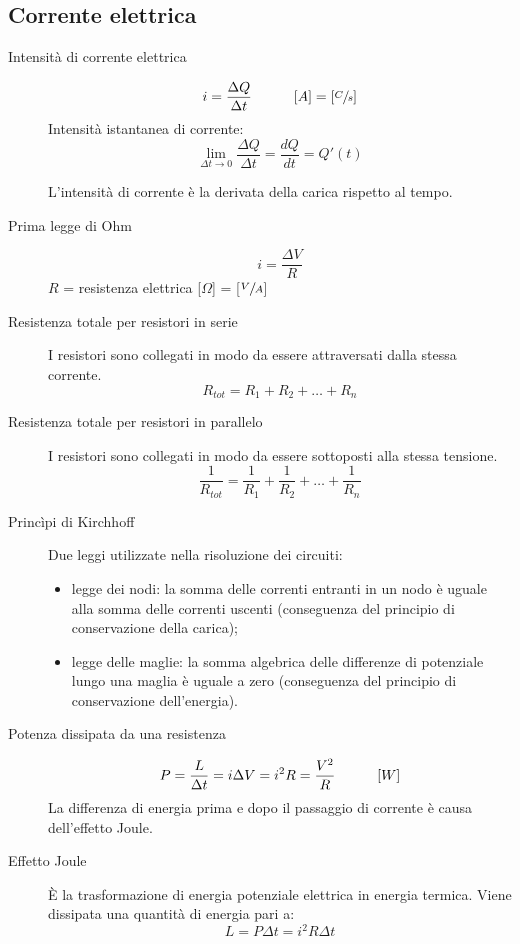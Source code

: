 \documentclass[a4paper,11pt,italian]{article}
\begin{document}
\subsection{Corrente elettrica}
\begin{description}
  \item[Intensità di corrente elettrica]
  \[ i = \frac{\Delta Q}{\Delta t} \hspace*{3em} [A] = \left[ \sfrac{C}{s} \right] \]
  Intensità istantanea di corrente:   
  \[ \lim_{\Delta t \rightarrow 0} \frac{\Delta Q}{\Delta t} = \frac{dQ}{dt} = Q'(t) \]
  
  L'intensità di corrente è la derivata della carica rispetto al tempo.
  
  \item[Prima legge di Ohm]
  \[ i = \frac{\Delta V}{R} \]
  $ R $ = resistenza elettrica [$ \Omega$] = [$\sfrac{V}{A} $]
  
  \item[Resistenza totale per resistori in serie] 
  I resistori sono collegati in modo da essere attraversati dalla stessa corrente.
  \[ R_{tot} = R_1 + R_2 + \ldots + R_n \]
  
  \item[Resistenza totale per resistori in parallelo] 
  I resistori sono collegati in modo da essere sottoposti alla stessa tensione.
  \[ \frac{1}{R_{tot}} = \frac{1}{R_1} + \frac{1}{R_2} + \ldots + \frac{1}{R_n}  \]
  
  \item[Princìpi di Kirchhoff] 
  Due leggi utilizzate nella risoluzione dei circuiti:
  \begin{itemize}
    \item legge dei nodi: la somma delle correnti entranti in un nodo è uguale alla somma delle correnti uscenti (conseguenza del principio di conservazione della carica);
    \item legge delle maglie: la somma algebrica delle differenze di potenziale lungo una maglia è uguale a zero (conseguenza del principio di conservazione dell'energia).
  \end{itemize}
  
  \item[Potenza dissipata da una resistenza]
  \[ P = \frac{L}{\Delta t} = i \Delta V = i^2 R = \frac{V^2}{R} \hspace*{3em} [W] \]
  La differenza di energia prima e dopo il passaggio di corrente è causa dell'effetto Joule.
  
  \item[Effetto Joule] 
  È la trasformazione di energia potenziale elettrica in energia termica. Viene dissipata una quantità di energia pari a:
  \[ L = P \Delta t = i^2 R \Delta t \]
  

\end{description}
\end{document}
